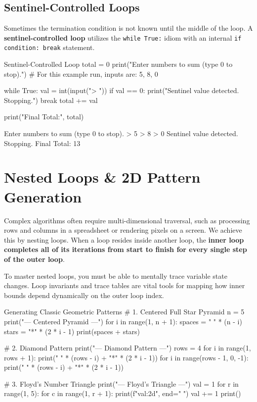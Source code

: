 \subsection{Sentinel-Controlled Loops}

Sometimes the termination condition is not known until the middle of the loop. A \textbf{sentinel-controlled loop} utilizes the \texttt{while True:} idiom with an internal \texttt{if condition: break} statement.

\begin{pythoncode}{Sentinel-Controlled Loop}
total = 0
print("Enter numbers to sum (type 0 to stop).")
# For this example run, inputs are: 5, 8, 0

while True:
    val = int(input("> "))
    if val == 0:
        print("Sentinel value detected. Stopping.")
        break
    total += val

print("Final Total:", total)
\end{pythoncode}
\begin{outputbox}
Enter numbers to sum (type 0 to stop).
> 5
> 8
> 0
Sentinel value detected. Stopping.
Final Total: 13
\end{outputbox}

\section{Nested Loops \& 2D Pattern Generation}

Complex algorithms often require multi-dimensional traversal, such as processing rows and columns in a spreadsheet or rendering pixels on a screen. We achieve this by nesting loops. When a loop resides inside another loop, the \textbf{inner loop completes all of its iterations from start to finish for every single step of the outer loop}.

To master nested loops, you must be able to mentally trace variable state changes. Loop invariants and trace tables are vital tools for mapping how inner bounds depend dynamically on the outer loop index.

\begin{pythoncode}{Generating Classic Geometric Patterns}
# 1. Centered Full Star Pyramid
n = 5
print("--- Centered Pyramid ---")
for i in range(1, n + 1):
    spaces = " " * (n - i)
    stars = "*" * (2 * i - 1)
    print(spaces + stars)

# 2. Diamond Pattern
print("\n--- Diamond Pattern ---")
rows = 4
for i in range(1, rows + 1):
    print(" " * (rows - i) + "*" * (2 * i - 1))
for i in range(rows - 1, 0, -1):
    print(" " * (rows - i) + "*" * (2 * i - 1))

# 3. Floyd's Number Triangle
print("\n--- Floyd's Triangle ---")
val = 1
for r in range(1, 5):
    for c in range(1, r + 1):
        print(f"{val:2d}", end=" ")
        val += 1
    print()
\end{pythoncode}

